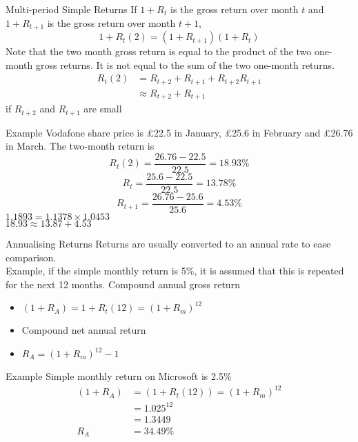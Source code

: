 \documentclass[14pt,xcolor=pdftex,dvipsnames,table]{beamer}
\begin{document}
\begin{frame}{Multi-period Simple Returns}
If $1+R_t$ is the gross return over month $t$ and $1+R_{t+1}$ is the gross return over month $t+1$, 
\begin{equation}
1+R_t(2) = (1+R_{t+1})(1+R_t)
\end{equation}
Note that the two month gross return is equal to the product of the two one-month gross returns.  It is not equal to the sum of the two one-month returns. 
\begin{align*}
R_t(2) &= R_{t+2}+R_{t+1}+R_{t+2}R_{t+1}\\
& \approx R_{t+2}+R_{t+1}
\end{align*}
if $R_{t+2}$ and $R_{t+1}$ are small 
\end{frame}

\begin{frame}{Example}
Vodafone share price is £22.5 in January, £25.6 in February and £26.76 in March. The two-month return is 
\begin{equation}
R_t(2) = \frac{26.76-22.5}{22.5} = 18.93\%
\end{equation}
\begin{equation}
R_t=\frac{25.6-22.5}{22.5} = 13.78\%
\end{equation}
\begin{equation}
R_{t+1}=\frac{26.76-25.6}{25.6} = 4.53\%
\end{equation}
$1.1893 =1.1378 \times 1.0453$\\
$18.93  \approx 13.87 + 4.53$
\end{frame}

\begin{frame}{Annualising Returns}
Returns are usually converted to an annual rate to ease comparison. \\
Example, if the simple monthly return is 5\%, it is assumed that this is repeated for the next 12 months. 
Compound annual gross return \\
\begin{itemize}
\item $(1+R_A) = 1+R_t(12) = (1+R_m)^{12}$\\
\item Compound net annual return \\
\item $R_A = (1+R_m)^{12} - 1$
\end{itemize}
\end{frame}

\begin{frame}{Example}
Simple monthly return on Microsoft is 2.5\%
\begin{align*}
(1+R_A) &= (1 + R_t(12)) = (1+ R_m)^{12}\\
&= 1.025^{12}\\
&= 1.3449\\
R_A &= 34.49\%
\end{align*}
\end{frame}
\end{document}
